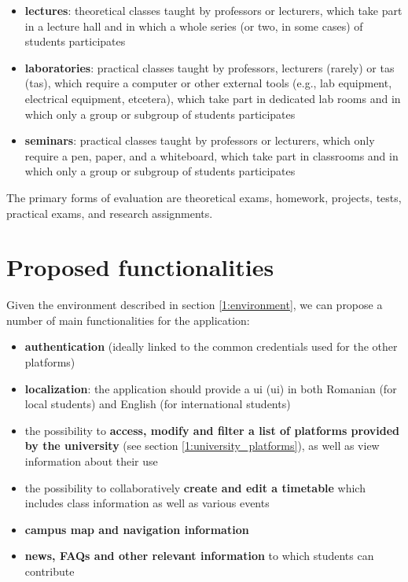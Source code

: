    \begin{itemize}
        \item \textbf{lectures}: theoretical classes taught by professors or lecturers, which take part in a lecture hall and in which a whole series (or two, in some cases) of students participates
        \item \textbf{laboratories}: practical classes taught by professors, lecturers (rarely) or \acrshort{ta}s (\acrlong{ta}s), which require a computer or other external tools (e.g., lab equipment, electrical equipment, etcetera), which take part in dedicated lab rooms and in which only a group or subgroup of students participates
        \item \textbf{seminars}: practical classes taught by professors or lecturers, which only require a pen, paper, and a whiteboard, which take part in classrooms and in which only a group or subgroup of students participates
    \end{itemize}
    
    The primary forms of evaluation are theoretical exams, homework, projects, tests, practical exams, and research assignments.
        
\section{Proposed functionalities} \label{1:functionalities}

    Given the environment described in section \ref{1:environment}, we can propose a number of main functionalities for the application:
    
    \begin{itemize}
        \item \textbf{authentication} (ideally linked to the common credentials used for the other platforms)
        \item \textbf{localization}: the application should provide a \acrshort{ui} (\acrlong{ui}) in both Romanian (for local students) and English (for international students)
        \item the possibility to \textbf{access, modify and filter a list of platforms provided by the university} (see section \ref{1:university_platforms}), as well as view information about their use
        \item the possibility to collaboratively \textbf{create and edit a timetable} which includes class information as well as various events
        \item \textbf{campus map and navigation information}
        \item \textbf{news, FAQs and other relevant information} to which students can contribute
    \end{itemize}

